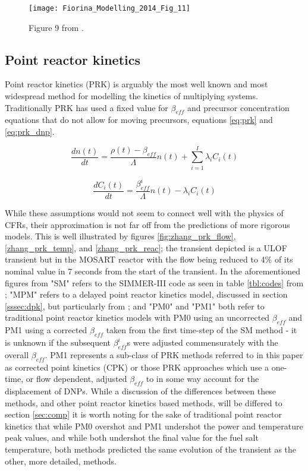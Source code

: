 \documentclass[review]{elsarticle}
\begin{document}
\begin{figure}[h]
   \centering
   \texttt{[image: Fiorina\_Modelling\_2014\_Fig\_11]}
   \caption{Figure 9 from \cite{fiorina_modelling_2014}.} 
   \label{fig:fiorina_msfr_ulof}
\end{figure}

\subsection{Point reactor kinetics} \label{ssec:prk}
Point reactor kinetics (PRK) is arguably the most well known and most widespread
method for modelling the kinetics of multiplying systems. Traditionally PRK
has used a fixed value for $\beta_{eff}$ and precursor concentration equations
that do not allow for moving precursors, equations \ref{eq:prk} and
\ref{eq:prk_dnp}.

\begin{equation}
    \label{eq:prk}
    \frac{dn(t)}{dt} = \frac{\rho(t) - \beta_{eff}}{\Lambda} n(t) +
     \sum_{i = 1}^{I} \lambda_{i} C_{i}(t)
\end{equation}

\begin{equation}
    \label{eq:prk_dnp}
    \frac{dC_{i}(t)}{dt} = \frac{\beta_{eff}^{i}}{\Lambda} n(t) -
        \lambda_{i} C_{i}(t)
\end{equation}

While these assumptions would not seem to connect well
with the physics of CFRs, their approximation is not far off from the
predictions of more rigorous models. This is well illustrated by figures
\ref{fig:zhang_prk_flow}, \ref{zhang_prk_temp}, and \ref{zhang_prk_reac};
the transient depicted is a ULOF transient but in the MOSART reactor with the
flow being reduced to 4\% of its nominal value in 7 seconds from the start
of the transient. In
the aforementioned figures from \cite{zhang_comparison_2009} "SM" refers
to the SIMMER-III code as seen in table \ref{tbl:codes} from
\cite{rineiski_kinetics_2005}; "MPM" refers to a delayed point reactor kinetics
model, discussed in section \ref{sssec:dpk}, but particularly from
\cite{suzuki_reactivity-initiated-accident_2008}; and "PM0" and "PM1" both
refer to traditional point reactor kinetics models with PM0 using an
uncorrected $\beta_{eff}$ and PM1 using a corrected $\beta_{eff}$ taken from
the first time-step of the SM method - it is unknown if the subsequent
$\beta_{eff}^{i}$s were adjusted commensurately with the overall $\beta_{eff}$.
PM1 represents a sub-class of PRK methods referred to in this paper as
corrected point kinetics (CPK) or those PRK approaches which use a one-time, or
flow dependent, adjusted $\beta_{eff}$ to in some way account for the
displacement of DNPs.
While a discussion of the differences between these methods, and other point
reactor kinetics based methods, will be differed to section \ref{sec:comp}
it is worth noting for the sake of traditional point reactor kinetics that
while PM0 overshot and PM1 undershot the power and temperature peak values, and
while both undershot the final value for the fuel salt temperature, both methods
predicted the same evolution of the transient as the other, more detailed,
methods.
\end{document}
